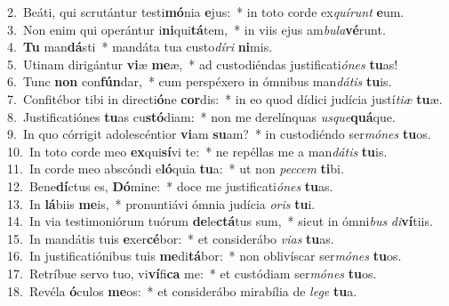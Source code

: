 {2.~}Beáti, qui scrutántur testi\textbf{mó}nia \textbf{e}jus:~* in toto corde ex\textit{quí}\textit{runt} \textbf{e}um.\\
{3.~}Non enim qui operántur i\textbf{ni}qui\textbf{tá}tem,~* in viis ejus am\textit{bu}\textit{la}\textbf{vé}runt.\\
{4.~}\textbf{Tu} man\textbf{dá}sti~* mandáta tua custo\textit{dí}\textit{ri} \textbf{ni}mis.\\
{5.~}Utinam dirigántur \textbf{vi}æ \textbf{me}æ,~* ad custodiéndas justificati\textit{ó}\textit{nes} \textbf{tu}as!\\
{6.~}Tunc \textbf{non} con\textbf{fún}dar,~* cum perspéxero in ómnibus man\textit{dá}\textit{tis} \textbf{tu}is.\\
{7.~}Confitébor tibi in directi\textbf{ó}ne \textbf{cor}dis:~* in eo quod dídici judícia justí\textit{ti}\textit{æ} \textbf{tu}æ.\\
{8.~}Justificatiónes \textbf{tu}as cu\textbf{stó}diam:~* non me derelínquas \textit{us}\textit{que}\textbf{quá}que.\\
{9.~}In quo córrigit adolescéntior \textbf{vi}am \textbf{su}am?~* in custodiéndo ser\textit{mó}\textit{nes} \textbf{tu}os.\\
{10.~}In toto corde meo \textbf{ex}qui\textbf{sí}vi te:~* ne repéllas me a man\textit{dá}\textit{tis} \textbf{tu}is.\\
{11.~}In corde meo abscóndi e\textbf{ló}quia \textbf{tu}a:~* ut non \textit{pec}\textit{cem} \textbf{ti}bi.\\
{12.~}Bene\textbf{dí}ctus es, \textbf{Dó}mine:~* doce me justificati\textit{ó}\textit{nes} \textbf{tu}as.\\
{13.~}In \textbf{lá}biis \textbf{me}is,~* pronuntiávi ómnia judícia \textit{o}\textit{ris} \textbf{tu}i.\\
{14.~}In via testimoniórum tuórum \textbf{de}le\textbf{ctá}tus sum,~* sicut in ómni\textit{bus} \textit{di}\textbf{ví}tiis.\\
{15.~}In mandátis tuis \textbf{e}xer\textbf{cé}bor:~* et considerábo \textit{vi}\textit{as} \textbf{tu}as.\\
{16.~}In justificatiónibus tuis \textbf{me}di\textbf{tá}bor:~* non oblivíscar ser\textit{mó}\textit{nes} \textbf{tu}os.\\
{17.~}Retríbue servo tuo, vi\textbf{ví}fi\textbf{ca} me:~* et custódiam ser\textit{mó}\textit{nes} \textbf{tu}os.\\
{18.~}Revéla \textbf{ó}culos \textbf{me}os:~* et considerábo mirabília de \textit{le}\textit{ge} \textbf{tu}a.\\
